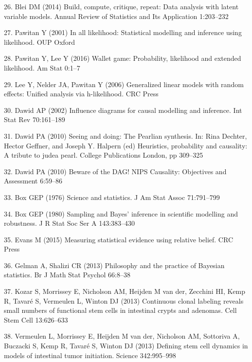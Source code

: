 \documentclass[10pt,letterpaper]{article}
\begin{document}
\hypertarget{ref-Blei2014-dh}{}
26. Blei DM (2014) Build, compute, critique, repeat: Data analysis with
latent variable models. Annual Review of Statistics and Its Application
1:203--232

\hypertarget{ref-Pawitan2001-xm}{}
27. Pawitan Y (2001) In all likelihood: Statistical modelling and
inference using likelihood. OUP Oxford

\hypertarget{ref-Pawitan2016-cz}{}
28. Pawitan Y, Lee Y (2016) Wallet game: Probability, likelihood and
extended likelihood. Am Stat 0:1--7

\hypertarget{ref-Lee2006-mr}{}
29. Lee Y, Nelder JA, Pawitan Y (2006) Generalized linear models with
random effects: Unified analysis via h-likelihood. CRC Press

\hypertarget{ref-Dawid2002-ry}{}
30. Dawid AP (2002) Influence diagrams for causal modelling and
inference. Int Stat Rev 70:161--189

\hypertarget{ref-Dawid2010-ab}{}
31. Dawid PA (2010) Seeing and doing: The Pearlian synthesis. In: Rina
Dechter, Hector Geffner, and Joseph Y. Halpern (ed) Heuristics,
probability and causality: A tribute to judea pearl. College
Publications London, pp 309--325

\hypertarget{ref-Dawid2010-yg}{}
32. Dawid PA (2010) Beware of the DAG! NIPS Causality: Objectives and
Assessment 6:59--86

\hypertarget{ref-Box1976-he}{}
33. Box GEP (1976) Science and statistics. J Am Stat Assoc 71:791--799

\hypertarget{ref-Box1980-ch}{}
34. Box GEP (1980) Sampling and Bayes' inference in scientific modelling
and robustness. J R Stat Soc Ser A 143:383--430

\hypertarget{ref-Evans2015-kg}{}
35. Evans M (2015) Measuring statistical evidence using relative belief.
CRC Press

\hypertarget{ref-Gelman2013-wc}{}
36. Gelman A, Shalizi CR (2013) Philosophy and the practice of Bayesian
statistics. Br J Math Stat Psychol 66:8--38

\hypertarget{ref-Kozar2013-mr}{}
37. Kozar S, Morrissey E, Nicholson AM, Heijden M van der, Zecchini HI,
Kemp R, Tavaré S, Vermeulen L, Winton DJ (2013) Continuous clonal
labeling reveals small numbers of functional stem cells in intestinal
crypts and adenomas. Cell Stem Cell 13:626--633

\hypertarget{ref-Vermeulen2013-ew}{}
38. Vermeulen L, Morrissey E, Heijden M van der, Nicholson AM, Sottoriva
A, Buczacki S, Kemp R, Tavaré S, Winton DJ (2013) Defining stem cell
dynamics in models of intestinal tumor initiation. Science 342:995--998
\end{document}

